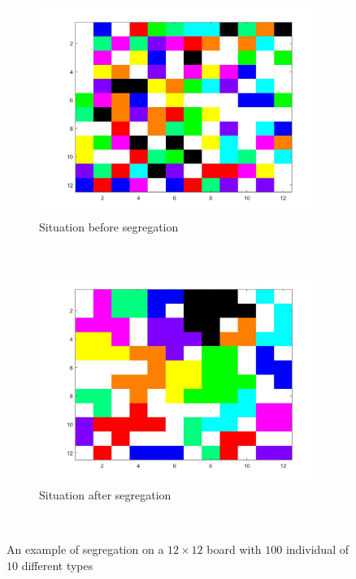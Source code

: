 \vspace{-10pt}
\begin{figure}[H]
	\centering
    \begin{subfigure}{0.45\textwidth}
        \includegraphics[width=\textwidth]{vb2beginbord.jpg}
        \caption{Situation before segregation}
        \label{fig:example big board begin}
    \end{subfigure}\hspace{0cm}
    ~ 
    \begin{subfigure}{0.45\textwidth}
        \includegraphics[width=\textwidth]{vb2eindbord.jpg}
        \caption{Situation after segregation}
        \label{fig:example big board end}
    \end{subfigure}
    ~ 
    \vspace{-5pt}
    \caption{An example of segregation on a $12\times 12$ board with $100$ individual of $10$ different types}
    \label{fig:example big board}
\end{figure}
\vspace{-10pt}

